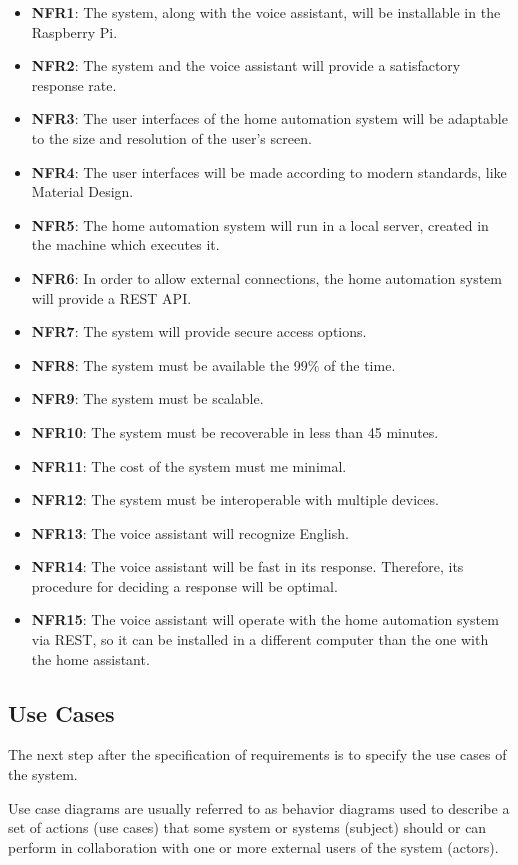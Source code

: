 \begin{itemize}
	\item \textbf{NFR1}: The system, along with the voice assistant, will be installable in the Raspberry Pi.
	\item \textbf{NFR2}: The system and the voice assistant will provide a satisfactory response rate.
	\item \textbf{NFR3}: The user interfaces of the home automation system will be adaptable to the size and resolution of the
	user's screen.
	\item \textbf{NFR4}: The user interfaces will be made according to modern standards, like Material Design.
	\item \textbf{NFR5}: The home automation system will run in a local server, created in the machine which executes it.
	\item \textbf{NFR6}: In order to allow external connections, the home automation system will provide a REST API.
	\item \textbf{NFR7}: The system will provide secure access options.
	\item \textbf{NFR8}: The system must be available the 99\% of the time.
	\item \textbf{NFR9}: The system must be scalable.
	\item \textbf{NFR10}: The system must be recoverable in less than 45 minutes.
	\item \textbf{NFR11}: The cost of the system must me minimal.
	\item \textbf{NFR12}: The system must be interoperable with multiple devices.
	\item \textbf{NFR13}: The voice assistant will recognize English.
	\item \textbf{NFR14}: The voice assistant will be fast in its response. Therefore, its procedure for deciding a response will 
	be optimal.
	\item \textbf{NFR15}: The voice assistant will operate with the home automation system via REST, so it can be installed in a
	different computer than the one with the home assistant.
\end{itemize}

\subsection{Use Cases}
The next step after the specification of requirements is to specify the use cases of the system.

Use case diagrams are usually referred to as behavior diagrams used to describe a set of actions (use cases) that some system or 
systems (subject) should or can perform in collaboration with one or more external users of the system (actors).\cite{umlUseCaseDiagrams}

